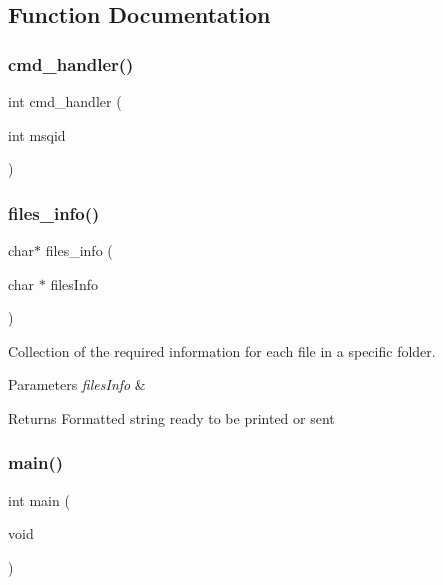 \subsection{Function Documentation}
\mbox{\label{fileserv_8c_a975d9337db509c0204b110f51d723160}} 
\subsubsection{cmd\+\_\+handler()}
{\footnotesize\ttfamily int cmd\+\_\+handler (\begin{DoxyParamCaption}\item[{int}]{msqid }\end{DoxyParamCaption})}

\mbox{\label{fileserv_8c_a28f9a6d37e4dbc8b5bf5fad1025285e3}} 
\subsubsection{files\+\_\+info()}
{\footnotesize\ttfamily char$\ast$ files\+\_\+info (\begin{DoxyParamCaption}\item[{char $\ast$}]{files\+Info }\end{DoxyParamCaption})}



Collection of the required information for each file in a specific folder. 


\begin{DoxyParams}{Parameters}
{\em files\+Info} & \\
\hline
\end{DoxyParams}
\begin{DoxyReturn}{Returns}
Formatted string ready to be printed or sent 
\end{DoxyReturn}
\mbox{\label{fileserv_8c_a840291bc02cba5474a4cb46a9b9566fe}} 
\subsubsection{main()}
{\footnotesize\ttfamily int main (\begin{DoxyParamCaption}\item[{void}]{ }\end{DoxyParamCaption})}

